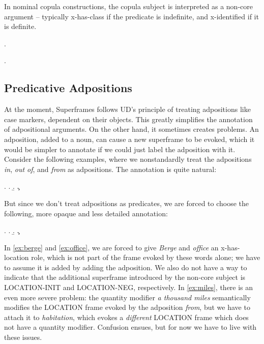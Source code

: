 \documentclass[a4paper]{article}
\newcommand{\fr}[1]{\textsf{#1}}
\newcommand{\rl}[1]{\textsf{#1}}
\begin{document}
In nominal copula constructions, the copula subject is interpreted as a
non-core argument -- typically \rl{x-has-class} if the predicate is indefinite,
and \rl{x-identified} if it is definite.

\ex.

\ex.

\newpage\subsection{Predicative Adpositions}

At the moment, Superframes follows UD's principle of treating adpositions like
case markers, dependent on their objects. This greatly simplifies the
annotation of adpositional arguments. On the other hand, it sometimes creates
problems. An adposition, added to a noun, can cause a new superframe to be
evoked, which it would be simpler to annotate if we could just label the
adposition with it. Consider the following examples, where we nonstandardly
treat the adpositions \emph{in}, \emph{out of}, and \emph{from} as adpositions.
The annotation is quite natural:

\ex.
\a.
\b.
\c.

But since we don't treat adpositions as predicates, we are forced to choose the following, more opaque and less detailed annotation:

\ex.
\a.\label{ex:berge}
\b.\label{ex:office}
\c.\label{ex:miles}

In \ref{ex:berge} and \ref{ex:office}, we are forced to give \emph{Berge} and
\emph{office} an \rl{x-has-location} role, which is not part of the frame
evoked by these words alone; we have to assume it is added by adding the
adposition. We also do not have a way to indicate that the additional
superframe introduced by the non-core subject is \fr{LOCATION-INIT} and
\fr{LOCATION-NEG}, respectively. In \ref{ex:miles}, there is an even more
severe problem: the quantity modifier \emph{a thousand miles} semantically
modifies the \fr{LOCATION} frame evoked by the adposition \emph{from}, but we
have to attach it to \emph{habitation}, which evokes a \emph{different}
\fr{LOCATION} frame which does not have a quantity modifier. Confusion ensues,
but for now we have to live with these issues.
\end{document}
